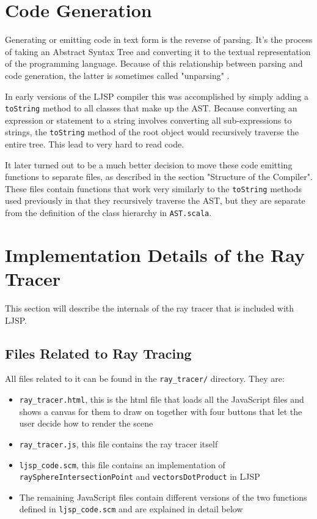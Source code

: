 \documentclass[11pt]{report}
\begin{document}



\section{Code Generation}
Generating or emitting code in text form is the reverse of parsing. It's the process of taking an Abstract Syntax Tree and converting it to the textual representation of the programming language. Because of this relationship between parsing and code generation, the latter is sometimes called "unparsing" \cite{nanopass}.

In early versions of the LJSP compiler this was accomplished by simply adding a \texttt{toString} method to all classes that make up the AST. Because converting an expression or statement to a string involves converting all sub-expressions to strings, the \texttt{toString} method of the root object would recursively traverse the entire tree. This lead to very hard to read code. 

It later turned out to be a much better decision to move these code emitting functions to separate files, as described in the section "Structure of the Compiler". These files contain functions that work very similarly to the \texttt{toString} methods used previously in that they recursively traverse the AST, but they are separate from the definition of the class hierarchy in \texttt{AST.scala}.

\section{Implementation Details of the Ray Tracer}
This section will describe the internals of the ray tracer that is included with LJSP.
\subsection{Files Related to Ray Tracing}
All files related to it can be found in the \texttt{ray_tracer/} directory. They are:
\begin{itemize}
\item \texttt{ray_tracer.html}, this is the html file that loads all the JavaScript files and shows a canvas for them to draw on together with four buttons that let the user decide how to render the scene
\item \texttt{ray_tracer.js}, this file contains the ray tracer itself
\item \texttt{ljsp_code.scm}, this file contains an implementation of \texttt{raySphereIntersectionPoint} and \texttt{vectorsDotProduct} in LJSP
\item The remaining JavaScript files contain different versions of the two functions defined in \texttt{ljsp_code.scm} and are explained in detail below
\end{itemize}
\end{document}
